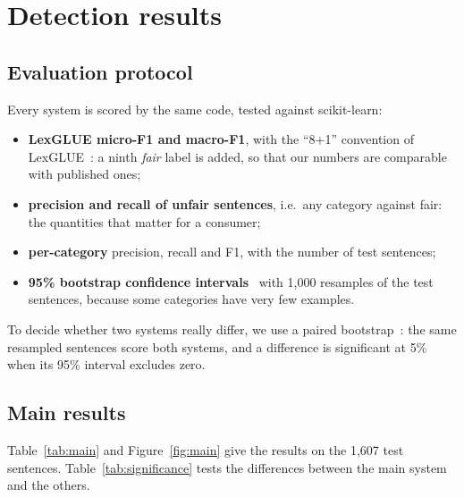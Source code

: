 \section{Detection results}
\label{sec:results}

\subsection{Evaluation protocol}

Every system is scored by the same code, tested against scikit-learn:
\begin{itemize}
  \item \textbf{LexGLUE micro-F1 and macro-F1}, with the ``8+1'' convention of LexGLUE~\citep{chalkidis2022lexglue}: a ninth \emph{fair} label is added, so that our numbers are comparable with published ones;
  \item \textbf{precision and recall of unfair sentences}, i.e.\ any category against fair: the quantities that matter for a consumer;
  \item \textbf{per-category} precision, recall and F1, with the number of test sentences;
  \item \textbf{95\% bootstrap confidence intervals}~\citep{efron1993} with 1,000 resamples of the test sentences, because some categories have very few examples.
\end{itemize}
To decide whether two systems really differ, we use a paired bootstrap~\citep{bergkirkpatrick2012}: the same resampled sentences score both systems, and a difference is significant at 5\% when its 95\% interval excludes zero.

\subsection{Main results}

Table~\ref{tab:main} and Figure~\ref{fig:main} give the results on the 1,607 test sentences. Table~\ref{tab:significance} tests the differences between the main system and the others.

